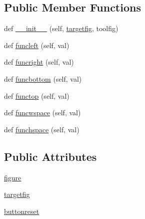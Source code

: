 \subsection*{Public Member Functions}
\begin{DoxyCompactItemize}
\item 
def \hyperlink{classmatplotlib_1_1widgets_1_1SubplotTool_aafe5aa2e2b85f7c2ed28f6659305f8ca}{\+\_\+\+\_\+init\+\_\+\+\_\+} (self, \hyperlink{classmatplotlib_1_1widgets_1_1SubplotTool_a4ec97e63a77286469e938b776188116e}{targetfig}, toolfig)
\item 
def \hyperlink{classmatplotlib_1_1widgets_1_1SubplotTool_a1e5b6df7bcd4977e7bdda99bb770b45a}{funcleft} (self, val)
\item 
def \hyperlink{classmatplotlib_1_1widgets_1_1SubplotTool_a2f343e7d409e803f0260f1e13d8859f3}{funcright} (self, val)
\item 
def \hyperlink{classmatplotlib_1_1widgets_1_1SubplotTool_a2071c433c1ade13558f960b8060e5358}{funcbottom} (self, val)
\item 
def \hyperlink{classmatplotlib_1_1widgets_1_1SubplotTool_adc0ecc80877e7af2333c6087553b8854}{functop} (self, val)
\item 
def \hyperlink{classmatplotlib_1_1widgets_1_1SubplotTool_a830862d944a4a26b6ae2c1f86cb804b5}{funcwspace} (self, val)
\item 
def \hyperlink{classmatplotlib_1_1widgets_1_1SubplotTool_a8cada0509062ac5bab7bc1bff7a2454b}{funchspace} (self, val)
\end{DoxyCompactItemize}
\subsection*{Public Attributes}
\begin{DoxyCompactItemize}
\item 
\hyperlink{classmatplotlib_1_1widgets_1_1SubplotTool_a3fdb8762bb3f9b65ceec18752566f785}{figure}
\item 
\hyperlink{classmatplotlib_1_1widgets_1_1SubplotTool_a4ec97e63a77286469e938b776188116e}{targetfig}
\item 
\hyperlink{classmatplotlib_1_1widgets_1_1SubplotTool_a158b3fd6d8034e0d3da0e25bd470d0f3}{buttonreset}
\end{DoxyCompactItemize}
